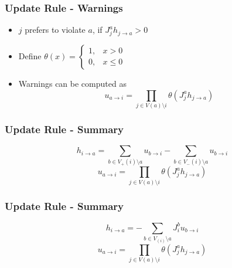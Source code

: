 \begin{frame}
	\frametitle{Update Rule - Warnings}
	
	\begin{itemize}
	\item $j$ prefers to violate $a$, if $J_j^a h_{j \rightarrow a} > 0$ 

    \item Define $\theta(x) = \begin{cases}
      1, & x > 0  \\
      0, & x \leq 0
    \end{cases}$
    
    \item Warnings can be computed as 
    $$u_{a \rightarrow i} = \prod_{j \in V(a) \setminus i} \theta(J_j^ah_{j\rightarrow a})$$
	\end{itemize}
\end{frame}

\begin{frame}
	\frametitle{Update Rule - Summary}
	$$ h_{i \rightarrow a} = \sum_{b \in V_+(i) \setminus a} u_{b \rightarrow i} - \sum_{b \in V_-(i) \setminus a} u_{b \rightarrow i}$$
	$$u_{a \rightarrow i} = \prod_{j \in V(a) \setminus i} \theta(J_j^ah_{j\rightarrow a})$$
\end{frame}
\begin{frame}
	\frametitle{Update Rule - Summary}
	$$ h_{i \rightarrow a} = - \sum_{b \in V_(i) \setminus a} J_i^b u_{b \rightarrow i}$$
	$$u_{a \rightarrow i} = \prod_{j \in V(a) \setminus i} \theta(J_j^ah_{j\rightarrow a})$$
\end{frame}

